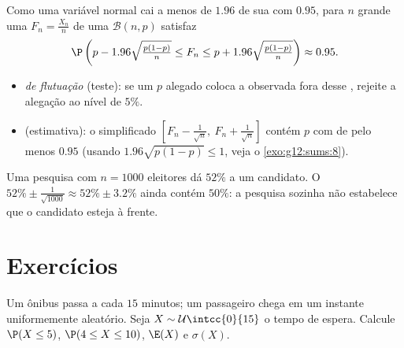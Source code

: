 \begin{method}\label{met:g12:contdist:fluctuation}
Como uma variável normal cai a menos de $1.96$  de sua 
com  $0.95$, para $n$ grande uma 
$F_n = \frac{X_n}{n}$ de uma  $\mathcal B(n,p)$ satisfaz
\[
\P\left(p - 1.96\sqrt{\tfrac{p(1-p)}{n}} \leq F_n \leq
p + 1.96\sqrt{\tfrac{p(1-p)}{n}}\right) \approx 0.95 .
\]
\begin{itemize}
  \item \emph{ de flutuação} (teste): se um $p$ alegado coloca a
         observada fora desse , rejeite a alegação ao
        nível de $5\%$.
  \item \emph{} (estimativa): o 
        simplificado
        $\left[F_n - \frac{1}{\sqrt n},\ F_n + \frac{1}{\sqrt n}\right]$
        contém $p$ com  de pelo menos $0.95$
        (usando $1.96\sqrt{p(1-p)} \leq 1$, veja o \cref{exo:g12:sums:8}).
\end{itemize}
\end{method}

\begin{example}\label{ex:g12:contdist:poll}
Uma pesquisa com $n = 1000$ eleitores dá $52\%$ a um candidato. O
 $52\% \pm \frac{1}{\sqrt{1000}} \approx 52\% \pm
3.2\%$ ainda contém $50\%$: a pesquisa sozinha não estabelece que o
candidato esteja à frente.
\end{example}

\section{Exercícios}

\begin{exercise}[$\star$]\label{exo:g12:contdist:1}
Um ônibus passa a cada $15$ minutos; um passageiro chega em um instante
uniformemente aleatório. Seja $X \sim \mathcal U\intcc{0}{15}$ o tempo de
espera. Calcule $\P(X \leq 5)$, $\P(4 \leq X \leq 10)$, $\E(X)$ e
$\sigma(X)$.
\end{exercise}

